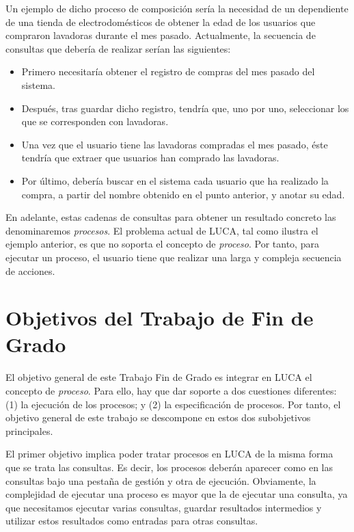 Un ejemplo de dicho proceso de composición sería la necesidad de un dependiente de una tienda de electrodomésticos de obtener la edad de los usuarios que compraron lavadoras durante el mes pasado. Actualmente, la secuencia de consultas que debería de realizar serían las siguientes:

\begin{itemize}
	\item Primero necesitaría obtener el registro de compras del mes pasado del sistema.
	\item Después, tras guardar dicho registro, tendría que, uno por uno, seleccionar los que se corresponden con lavadoras.
	\item Una vez que el usuario tiene las lavadoras compradas el mes pasado, éste tendría que extraer que usuarios han comprado las lavadoras.
	\item Por último, debería buscar en el sistema cada usuario que ha realizado la compra, a partir del nombre obtenido en el punto anterior, y anotar su edad.
\end{itemize}

En adelante, estas cadenas de consultas para obtener un resultado concreto las denominaremos \emph{procesos}. El problema actual de LUCA, tal como ilustra el ejemplo anterior, es que no soporta el concepto de \emph{proceso}. Por tanto, para ejecutar un proceso,  el usuario tiene que realizar una larga y compleja secuencia de acciones.

\section{Objetivos del Trabajo de Fin de Grado}

El objetivo general de este Trabajo Fin de Grado es integrar en LUCA el concepto de \emph{proceso}. Para ello, hay que dar soporte a dos cuestiones diferentes: (1) la ejecución de los procesos; y (2) la especificación de procesos. Por tanto, el objetivo general de este trabajo se descompone en estos dos subobjetivos principales.

El primer objetivo implica poder tratar procesos en LUCA de la misma forma que se trata las consultas. Es decir, los procesos deberán aparecer como en las consultas bajo una pestaña de gestión y otra de ejecución. Obviamente, la complejidad de ejecutar una proceso es mayor que la de ejecutar una consulta, ya que necesitamos ejecutar varias consultas, guardar resultados intermedios y utilizar estos resultados como entradas para otras consultas.

